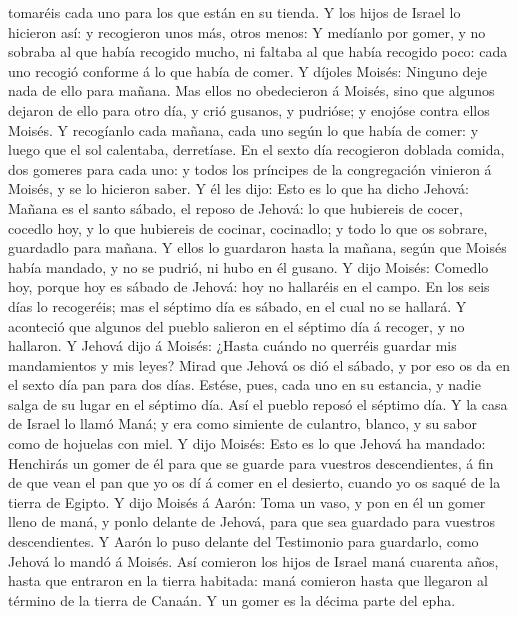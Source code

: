tomaréis cada uno para los que están en su tienda.  Y los
hijos de Israel lo hicieron así: y recogieron unos más, otros menos:
 Y medíanlo por gomer, y no sobraba al que había recogido
mucho, ni faltaba al que había recogido poco: cada uno recogió conforme
á lo que había de comer.  Y díjoles Moisés: Ninguno deje
nada de ello para mañana.  Mas ellos no obedecieron á
Moisés, sino que algunos dejaron de ello para otro día, y crió gusanos,
y pudrióse; y enojóse contra ellos Moisés.  Y recogíanlo
cada mañana, cada uno según lo que había de comer: y luego que el sol
calentaba, derretíase.  En el sexto día recogieron doblada
comida, dos gomeres para cada uno: y todos los príncipes de la
congregación vinieron á Moisés, y se lo hicieron saber.  Y
él les dijo: Esto es lo que ha dicho Jehová: Mañana es el santo sábado,
el reposo de Jehová: lo que hubiereis de cocer, cocedlo hoy, y lo que
hubiereis de cocinar, cocinadlo; y todo lo que os sobrare, guardadlo
para mañana.  Y ellos lo guardaron hasta la mañana, según
que Moisés había mandado, y no se pudrió, ni hubo en él gusano.
 Y dijo Moisés: Comedlo hoy, porque hoy es sábado de
Jehová: hoy no hallaréis en el campo.  En los seis días lo
recogeréis; mas el séptimo día es sábado, en el cual no se hallará.
 Y aconteció que algunos del pueblo salieron en el séptimo
día á recoger, y no hallaron.  Y Jehová dijo á Moisés:
¿Hasta cuándo no querréis guardar mis mandamientos y mis leyes?
 Mirad que Jehová os dió el sábado, y por eso os da en el
sexto día pan para dos días. Estése, pues, cada uno en su estancia, y
nadie salga de su lugar en el séptimo día.  Así el pueblo
reposó el séptimo día.  Y la casa de Israel lo llamó Maná;
y era como simiente de culantro, blanco, y su sabor como de hojuelas con
miel.  Y dijo Moisés: Esto es lo que Jehová ha mandado:
Henchirás un gomer de él para que se guarde para vuestros descendientes,
á fin de que vean el pan que yo os dí á comer en el desierto, cuando yo
os saqué de la tierra de Egipto.  Y dijo Moisés á Aarón:
Toma un vaso, y pon en él un gomer lleno de maná, y ponlo delante de
Jehová, para que sea guardado para vuestros descendientes. 
Y Aarón lo puso delante del Testimonio para guardarlo, como Jehová lo
mandó á Moisés.  Así comieron los hijos de Israel maná
cuarenta años, hasta que entraron en la tierra habitada: maná comieron
hasta que llegaron al término de la tierra de Canaán.  Y un
gomer es la décima parte del epha.

